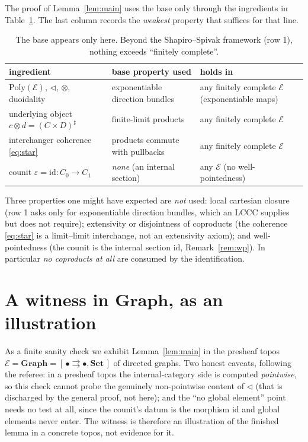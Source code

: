\documentclass[11pt]{amsart}
\theoremstyle{plain}
\theoremstyle{definition}
\theoremstyle{remark}
\newcommand{\Set}{\mathbf{Set}}
\newcommand{\Graph}{\mathbf{Graph}}
\newcommand{\Poly}{\mathrm{Poly}}
\newcommand{\Ee}{\mathcal{E}}
\newcommand{\sub}{\triangleleft}      %
\newcommand{\sharpc}[1]{#1^{\sharp}}   %
\newcommand{\id}{\mathrm{id}}
\begin{document}
The proof of Lemma~\ref{lem:main} uses the base only through the ingredients in
Table~\ref{tab:transport}. The last column records the \emph{weakest} property that suffices for that
line.

\begin{table}[h]
\centering
\small
\renewcommand{\arraystretch}{1.25}
\begin{tabular}{@{}lll@{}}
\toprule
ingredient & base property used & holds in \\
\midrule
$\Poly(\Ee)$, $\sub$, $\otimes$, duoidality & exponentiable direction bundles \cite{ShapiroSpivak2023} & any finitely complete $\Ee$ (exponentiable maps) \\
underlying object $c\otimes d=\sharpc{(C\times D)}$ & finite-limit products & any finitely complete $\Ee$ \\
interchanger coherence \eqref{eq:star} & products commute with pullbacks & any finitely complete $\Ee$ \\
counit $\varepsilon=\id:C_0\to C_1$ & \emph{none} (an internal section) & any $\Ee$ (no well-pointedness) \\
\bottomrule
\end{tabular}
\medskip
\caption{The base appears only here. Beyond the Shapiro--Spivak framework (row 1), nothing exceeds
``finitely complete''.}
\label{tab:transport}
\end{table}

Three properties one might have expected are \emph{not} used: local cartesian closure (row 1 asks only
for exponentiable direction bundles, which an LCCC supplies but does not require); extensivity or
disjointness of coproducts (the coherence \eqref{eq:star} is a limit--limit interchange, not an
extensivity axiom); and well-pointedness (the counit is the internal section $\id$,
Remark~\ref{rem:wp}). In particular \emph{no coproducts at all} are consumed by the identification.

\section{A witness in \texorpdfstring{$\Graph$}{Graph}, as an illustration}\label{sec:graph}

As a finite sanity check we exhibit Lemma~\ref{lem:main} in the presheaf topos
$\Ee=\Graph=[\,\bullet\rightrightarrows\bullet,\Set\,]$ of directed graphs. Two honest caveats,
following the referee: in a presheaf topos the internal-category side is computed \emph{pointwise}, so
this check cannot probe the genuinely non-pointwise content of $\sub$ (that is discharged by the
general proof, not here); and the ``no global element'' point needs no test at all, since the
counit's datum is the morphism $\id$ and global elements never enter. The witness is therefore an
illustration of the finished lemma in a concrete topos, not evidence for it.
\end{document}
